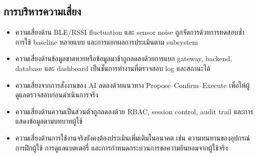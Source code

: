 \subsection*{การบริหารความเสี่ยง}
\begin{itemize}
    \item ความเสี่ยงด้าน BLE/RSSI fluctuation และ sensor noise ถูกจัดการด้วยการทดสอบซ้ำ การใช้ baseline หลายแบบ และการแยกผลการประเมินตาม subsystem 
    \item ความเสี่ยงด้านข้อมูลขาดหายหรือข้อมูลมาช้าถูกลดลงด้วยการแยก gateway, backend, database และ dashboard เป็นชั้นการทำงานที่ตรวจสอบ log และสถานะได้ 
    \item ความเสี่ยงจากการสั่งงานของ AI ลดลงด้วยแนวทาง Propose--Confirm--Execute เพื่อให้ผู้ดูแลตรวจสอบก่อนดำเนินการจริง 
    \item ความเสี่ยงด้านความเป็นส่วนตัวถูกลดลงด้วย RBAC, session control, audit trail และการแสดงข้อมูลตามบทบาทผู้ใช้ 
    \item ความเสี่ยงด้านการใช้งานจริงยังคงต้องประเมินเพิ่มเติมในอนาคต เช่น ความทนทานของอุปกรณ์ การฝึกผู้ใช้ การดูแลแบตเตอรี่ และการกำหนดกระบวนการขอความยินยอมจากผู้ใช้จริง 
\end{itemize}
